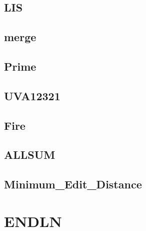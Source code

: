     \subsection{LIS}
        
    \subsection{merge}
          
    \subsection{Prime}
        
    \subsection{UVA12321}
        
    \subsection{Fire}
        
    \subsection{ALLSUM}
        
    \subsection{Minimum_Edit_Distance}
        
\section{ENDLN}
    

